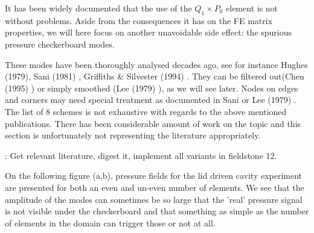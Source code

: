 
It has been widely documented that the use of the $Q_1 \times P_0$ element is 
not without problems. Aside from the 
consequences it has on the FE matrix properties, we will here focus on another unavoidable side effect: 
the spurious pressure checkerboard modes. 

These modes have been thoroughly analysed decades ago, see for instance
Hughes \etal (1979)\cite{hulb79}, 
Sani \etal (1981) \cite{sagl81a,sagl81b},
Griffiths \& Silvester (1994) \cite{grsi94}.
They can be filtered out(Chen (1995)  \cite{chpc95}) 
or simply smoothed (Lee \etal (1979) \cite{legs79}), as we will see later.
Nodes on edges and corners may need special treatment as documented in Sani \etal \cite{sagl81a} or
Lee \etal (1979) \cite{legs79}.
The list of 8 schemes is not exhaustive with regards to the above mentioned publications. 
There has been considerable amount of work on the topic and this section is 
unfortunately not representing the literature appropriately.

\mscthesis: Get relevant literature, digest it, implement all variants in fieldstone 12.


On the following figure (a,b), pressure fields for the lid driven cavity experiment 
are presented for both an even and un-even number of elements. We see that 
the amplitude of the modes can sometimes be so large that the 'real' pressure signal is 
not visible under the checkerboard and that something as simple as the number of elements in the 
domain can trigger those or not at all.


